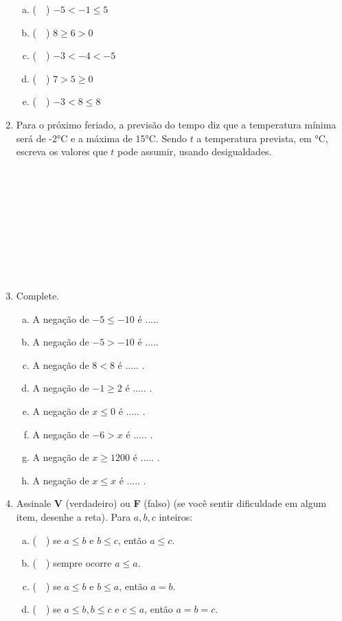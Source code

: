 \documentclass[a4paper,14pt]{article}
\begin{document}
\begin{multicols}{2}
\begin{enumerate}
\begin{enumerate}[a)]
				\item (~~) $-5 < -1 \leq 5$
				\item (~~) $8 \geq 6 > 0$
				\item (~~) $-3 < -4 < -5$
				\item (~~) $7 > 5 \geq 0$
				\item (~~) $-3 < 8 \leq 8$ \newpage
			\end{enumerate}
			\item Para o próximo feriado, a previsão do tempo diz que a temperatura mínima será de -2°C e a máxima de 15°C. Sendo $t$ a temperatura prevista, em °C, escreva os valores que $t$ pode assumir, usando desigualdades. \\\\\\\\\\\\\\\\\\\\
			\item Complete.
			\begin{enumerate}[a)]
				\item A negação de $-5 \leq -10$ é .....
				\item A negação de $-5 > -10$ é .....
				\item A negação de $8 < 8$ é ..... .
				\item A negação de $-1 \geq 2$ é ..... .
				\item A negação de $x \leq 0$ é ..... .
				\item A negação de $-6 > x$ é ..... .
				\item A negação de $x \geq 1 200$ é ..... .
				\item A negação de $x \leq x$ é ..... .
			\end{enumerate}
			\item Assinale \textbf{V} (verdadeiro) ou \textbf{F} (falso) (se você sentir dificuldade em algum item, desenhe a reta). Para $a, b, c$ inteiros:
			\begin{enumerate}[a)]
				\item (~~) se $a \leq b$ e $b \leq c$, então $a \leq c$.
				\item (~~) sempre ocorre $a \leq a$.
				\item (~~) se $a \leq b$ e $b \leq a$, então $a = b$.
				\item (~~) se $a \leq b, b \leq c$ e $c \leq a$, então $a = b = c$.

\end{enumerate}
\end{enumerate}
\end{multicols}
\end{document}
